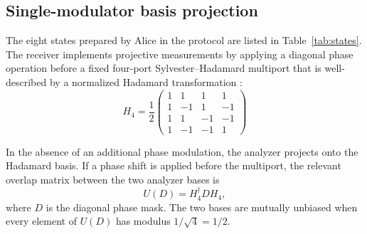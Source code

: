 \documentclass[pra,aps,reprint,nofootinbib,superscriptaddress,floatfix]{revtex4-2}
\begin{document}
\subsection*{Single-modulator basis projection}

The eight states prepared by Alice in the protocol are listed in Table~\ref{tab:states}. The receiver implements projective measurements by applying a diagonal phase operation before a fixed four-port Sylvester--Hadamard multiport that is well-described by a normalized Hadamard transformation \cite{Carine2020}:
\[
H_4=\frac{1}{2}
\begin{pmatrix}
1&1&1&1\\
1&-1&1&-1\\
1&1&-1&-1\\
1&-1&-1&1
\end{pmatrix}
\]
 
 In the absence of an additional phase modulation, the analyzer projects onto the Hadamard basis. If a phase shift is applied before the multiport, the relevant overlap matrix between the two analyzer bases is
\[
U(D)=H_4^\dagger D H_4 ,
\]
where \(D\) is the diagonal phase mask. The two bases are mutually unbiased when every element of \(U(D)\) has modulus \(1/\sqrt{4}=1/2\).
\end{document}
